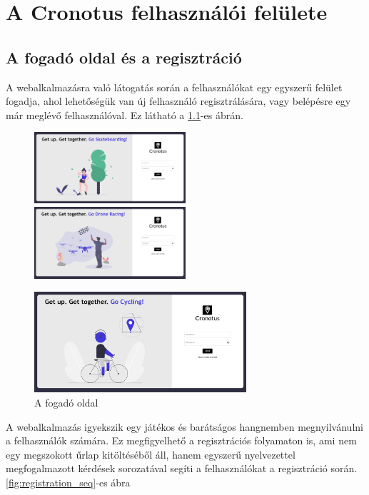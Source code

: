 \chapter{A Cronotus felhasználói felülete}

\section{A fogadó oldal és a regisztráció}

A webalkalmazásra való látogatás során a felhasználókat egy egyszerű felület fogadja, ahol lehetőségük van új felhasználó regisztrálására,
vagy belépésre egy már meglévő felhasználóval. Ez látható a \ref{fig:landing_page}-es ábrán.

\begin{figure}[h]
	\includegraphics[width=0.5\textwidth]{images/login_page.png}
	\includegraphics[width=0.5\textwidth]{images/login_2.png}
	\begin{center}
		\includegraphics[width=0.7\textwidth]{images/login_3.png}
	\end{center}
	\caption{A fogadó oldal}
	\label{fig:landing_page}
\end{figure}

\newpage


A webalkalmazás igyekszik egy játékos és barátságos hangnemben megnyilvánulni a felhasználók számára. Ez megfigyelhető a regisztrációs folyamaton
is, ami nem egy megszokott űrlap kitöltéséből áll, hanem egyszerű nyelvezettel megfogalmazott kérdések sorozatával segíti a felhasználókat
a regisztráció során. \ref{fig:registration_seq}-es ábra

